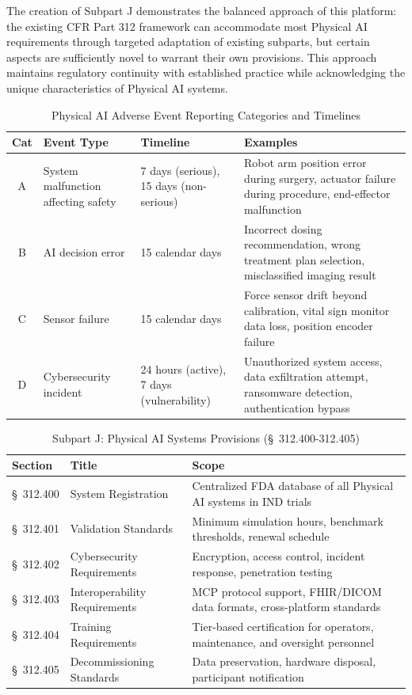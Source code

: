 The creation of Subpart J demonstrates the balanced approach of this platform:
the existing CFR Part 312 framework can accommodate most Physical AI
requirements through targeted adaptation of existing subparts, but certain
aspects are sufficiently novel to warrant their own provisions. This approach
maintains regulatory continuity with established practice while acknowledging
the unique characteristics of Physical AI systems.

\begin{table}[H]
\centering
\caption{Physical AI Adverse Event Reporting Categories and Timelines}
\label{tab:ae-categories}
\small
\begin{tabularx}{\textwidth}{c l l X}
\toprule
\textbf{Cat} & \textbf{Event Type} & \textbf{Timeline} & \textbf{Examples} \\
\midrule
A & System malfunction affecting safety & 7 days (serious), 15 days (non-serious) & Robot arm position error during surgery, actuator failure during procedure, end-effector malfunction \\
B & AI decision error & 15 calendar days & Incorrect dosing recommendation, wrong treatment plan selection, misclassified imaging result \\
C & Sensor failure & 15 calendar days & Force sensor drift beyond calibration, vital sign monitor data loss, position encoder failure \\
D & Cybersecurity incident & 24 hours (active), 7 days (vulnerability) & Unauthorized system access, data exfiltration attempt, ransomware detection, authentication bypass \\
\bottomrule
\end{tabularx}
\end{table}

\begin{table}[H]
\centering
\caption{Subpart J: Physical AI Systems Provisions (\S~312.400-312.405)}
\label{tab:subpart-j}
\small
\begin{tabularx}{\textwidth}{l l X}
\toprule
\textbf{Section} & \textbf{Title} & \textbf{Scope} \\
\midrule
\S~312.400 & System Registration & Centralized FDA database of all Physical AI systems in IND trials \\
\S~312.401 & Validation Standards & Minimum simulation hours, benchmark thresholds, renewal schedule \\
\S~312.402 & Cybersecurity Requirements & Encryption, access control, incident response, penetration testing \\
\S~312.403 & Interoperability Requirements & MCP protocol support, FHIR/DICOM data formats, cross-platform standards \\
\S~312.404 & Training Requirements & Tier-based certification for operators, maintenance, and oversight personnel \\
\S~312.405 & Decommissioning Standards & Data preservation, hardware disposal, participant notification \\
\bottomrule
\end{tabularx}
\end{table}

